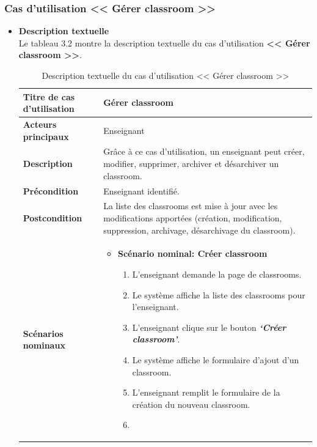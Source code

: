 \subsubsection{Cas d’utilisation << Gérer classroom >>}
\begin{itemize}[itemsep=1pt, parsep=1pt]
    \item \textbf{Description textuelle}\\
    Le tableau 3.2 montre la description textuelle du cas d’utilisation \textbf{<< Gérer classroom >>}.
    \begin{longtable}{|>{\RaggedRight\arraybackslash}p{4cm}|>{\RaggedRight\arraybackslash}p{12cm}|}
        \caption{ Description textuelle du cas d’utilisation << Gérer classroom >> } \\
        \hline
        \textbf{Titre de cas d’utilisation} & \textbf{Gérer classroom} \\
        \hline
        \textbf{Acteurs principaux} & Enseignant \\
        \hline
        \textbf{Description} & Grâce à ce cas d’utilisation, un enseignant peut créer, modifier, supprimer, archiver et désarchiver un classroom. \\
        \hline
        \textbf{Précondition} & Enseignant identifié. \\
        \hline
        \textbf{Postcondition} & La liste des classrooms est mise à jour avec les modifications apportées (création, modification, suppression, archivage, désarchivage du classroom). \\
        \hline
        \textbf{Scénarios nominaux} & 
        \begin{itemize}[label=]
            \item \textbf{Scénario nominal: Créer classroom}
            \begin{enumerate}
                \item L’enseignant demande la page de classrooms.
                \item Le système affiche la liste des classrooms pour l’enseignant. 
                \item L’enseignant clique sur le bouton \textbf{\textit{‘Créer classroom’}}.
                \item Le système affiche le formulaire d’ajout d’un classroom. 
                \item L’enseignant remplit le formulaire de la création du nouveau classroom.
                \item 
                \begin{enumerate}

\end{enumerate}
\end{enumerate}
\end{itemize}
\end{longtable}
\end{itemize}
